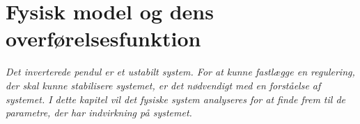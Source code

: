 \chapter{Fysisk model og dens overførelsesfunktion}\label{kap:chap_fysik_reg}

\emph{Det inverterede pendul er et ustabilt system. For at kunne fastlægge en regulering, der skal kunne stabilisere systemet, er det nødvendigt med en forståelse af systemet. I dette kapitel vil det fysiske system analyseres for at finde frem til de parametre, der har indvirkning på systemet.}

